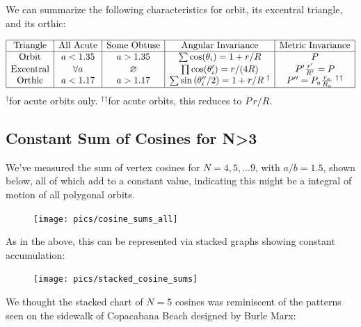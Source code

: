 \documentclass[]{article}
\begin{document}
We can summarize the following characteristics for orbit, its excentral triangle, and its orthic:

\[
\begin{array}{|c|c|c|c|c|}
\hline
\bf{\text{Triangle}} & \bf{\text{All Acute}} & \bf{\text{Some Obtuse}} & \bf{\text{Angular Invariance}} & \bf{\text{Metric Invariance}} \\
\hline
\text{Orbit} & a<1.35 & a>1.35 & \sum{\cos(\theta_i)} = 1+r/R & P \\
\text{Excentral} & \forall a & \varnothing  & \prod{\cos(\theta_i')}=r/(4R) & P'\frac{r'}{R'} = P  \\
\text{Orthic} & a<1.17 & a>1.17 & \sum{\sin{(\theta_i''/2)}}=1+r/R\;^\dagger &  P'' = P_a\frac{r_a}{R_a}\;{^\dagger}{^\dagger} \\
\hline
\end{array}
\]
\(^\dagger\)for acute orbits only.
\({^\dagger}{^\dagger}\)for acute orbits, this reduces to \(P\,r/R\).

\hypertarget{constant-sum-of-cosines-for-n3}{%
\subsection{Constant Sum of Cosines for N\textgreater{}3}\label{constant-sum-of-cosines-for-n3}}

We've measured the sum of vertex cosines for \(N=4,5,...9\), with \(a/b=1.5\), shown below, all of which add to a constant value, indicating this might be a integral of motion of all polygonal orbits.

\begin{figure}[H]

{\centering \texttt{[image: pics/cosine\_sums\_all]} 

}

\end{figure}

As in the above, this can be represented via stacked graphs showing constant accumulation:

\begin{figure}[H]

{\centering \texttt{[image: pics/stacked\_cosine\_sums]} 

}

\end{figure}

We thought the stacked chart of \(N=5\) cosines was reminiscent of the patterns seen on the sidewalk of Copacabana Beach designed by Burle Marx:
\end{document}
